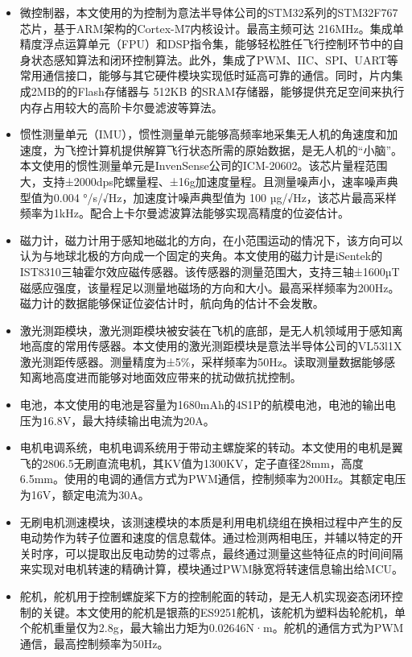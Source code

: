 \begin{itemize}
    \item 微控制器，本文使用的为控制为意法半导体公司的STM32系列的STM32F767芯片，基于ARM架构的Cortex-M7内核设计。最高主频可达 216MHz。集成单精度浮点运算单元（FPU）和DSP指令集，能够轻松胜任飞行控制环节中的自身状态感知算法和闭环控制算法。此外，集成了PWM、IIC、SPI、UART等常用通信接口，能够与其它硬件模块实现低时延高可靠的通信。同时，片内集成2MB的的Flash存储器与 512KB 的SRAM存储器，能够提供充足空间来执行内存占用较大的高阶卡尔曼滤波等算法。
    \item 惯性测量单元（IMU），惯性测量单元能够高频率地采集无人机的角速度和加速度，为飞控计算机提供解算飞行状态所需的原始数据，是无人机的“小脑”。本文使用的惯性测量单元是InvenSense公司的ICM-20602。该芯片量程范围大，支持±2000dps陀螺量程、±16g加速度量程。且测量噪声小，速率噪声典型值为0.004 °/s/√Hz，加速度计噪声典型值为 100 µg/√Hz，该芯片最高采样频率为1kHz。配合上卡尔曼滤波算法能够实现高精度的位姿估计。
    \item 磁力计，磁力计用于感知地磁北的方向，在小范围运动的情况下，该方向可以认为与地球北极的方向成一个固定的夹角。本文使用的磁力计是iSentek的IST8310三轴霍尔效应磁传感器。该传感器的测量范围大，支持三轴±1600µT磁感应强度，该量程足以测量地磁场的方向和大小。最高采样频率为200Hz。磁力计的数据能够保证位姿估计时，航向角的估计不会发散。
    \item 激光测距模块，激光测距模块被安装在飞机的底部，是无人机领域用于感知离地高度的常用传感器。本文使用的激光测距模块是意法半导体公司的VL53l1X激光测距传感器。测量精度为±5\%，采样频率为50Hz。读取测量数据能够感知离地高度进而能够对地面效应带来的扰动做抗扰控制。
    \item 电池，本文使用的电池是容量为1680mAh的4S1P的航模电池，电池的输出电压为16.8V，最大持续输出电流为20A。
    \item 电机电调系统，电机电调系统用于带动主螺旋桨的转动。本文使用的电机是翼飞的2806.5无刷直流电机，其KV值为1300KV，定子直径28mm，高度6.5mm。使用的电调的通信方式为PWM通信，控制频率为200Hz。其额定电压为16V，额定电流为30A。
    \item 无刷电机测速模块，该测速模块的本质是利用电机绕组在换相过程中产生的反电动势作为转子位置和速度的信息载体。通过检测两相电压，并辅以特定的开关时序，可以提取出反电动势的过零点，最终通过测量这些特征点的时间间隔来实现对电机转速的精确计算，模块通过PWM脉宽将转速信息输出给MCU。
    \item 舵机，舵机用于控制螺旋桨下方的控制舵面的转动，是无人机实现姿态闭环控制的关键。本文使用的舵机是银燕的ES9251舵机，该舵机为塑料齿轮舵机，单个舵机重量仅为2.8g，最大输出力矩为0.02646N·m。舵机的通信方式为PWM通信，最高控制频率为50Hz。

\end{itemize}
